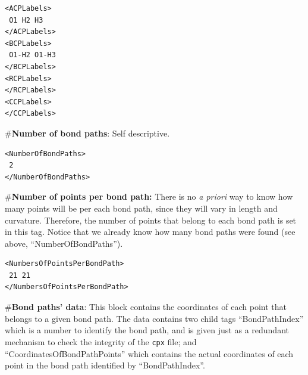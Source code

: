 \begin{verbatim}
<ACPLabels>
 O1 H2 H3
</ACPLabels>
<BCPLabels>
 O1-H2 O1-H3
</BCPLabels>
<RCPLabels>
</RCPLabels>
<CCPLabels>
</CCPLabels>
\end{verbatim}
\#\textbf{Number of bond paths}: Self descriptive.
\begin{verbatim}
<NumberOfBondPaths>
 2
</NumberOfBondPaths>
\end{verbatim}
\#\textbf{Number of points per bond path:} There is no \textit{a priori} way to know how many points will be per each bond path, since they will vary in length and curvature. Therefore, the number of points that belong to each bond path is set in this tag. Notice that we already know how many bond paths were found (see above, ``NumberOfBondPaths'').
\begin{verbatim}
<NumbersOfPointsPerBondPath>
 21 21
</NumbersOfPointsPerBondPath>
\end{verbatim}
\#\textbf{Bond paths' data}: This block contains the coordinates of each point that belongs to a given bond path. The data contains two child tags ``BondPathIndex'' which is a number to identify the bond path, and is given just as a redundant mechanism to check the integrity of the \texttt{cpx} file; and ``CoordinatesOfBondPathPoints'' which contains the actual coordinates of each point in the bond path identified by ``BondPathIndex''.
